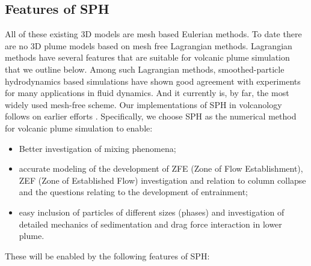 \documentclass[journal abbreviation, manuscript]{copernicus}
\begin{document}
\subsection{Features of SPH}
All of these existing 3D models are mesh based Eulerian methods. To date there are no 3D plume models based on mesh free Lagrangian methods. Lagrangian methods have several features that are suitable for volcanic plume simulation that we outline below. Among such Lagrangian methods, smoothed-particle hydrodynamics \citep{gingold1977smoothed,lucy1977numerical} based simulations have shown good agreement with experiments for many applications in fluid dynamics. And it currently is, by far, the most widely used mesh-free scheme. Our implementations of SPH in volcanology follows on earlier efforts   \citep{bursik2003smoothed,herault2010sph,haddad2016smoothed}.
Specifically, we choose SPH as the numerical method for volcanic plume simulation to enable:
\begin{itemize}
\item Better investigation of mixing phenomena;
\item accurate modeling of the development of ZFE (Zone of Flow Establishment), ZEF (Zone of Established Flow) investigation and relation to column collapse and the questions relating to the development of entrainment; %
\item  easy inclusion of particles of different sizes (phases) and investigation of detailed mechanics of sedimentation and drag force interaction in lower plume.
\end{itemize}
These  will be enabled by the following features of SPH:
\end{document}
